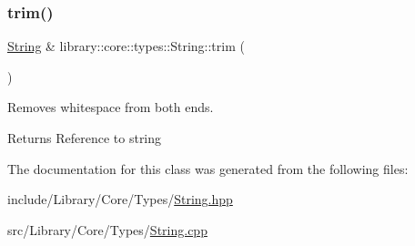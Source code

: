 \subsubsection{\texorpdfstring{trim()}{trim()}}
{\footnotesize\ttfamily \hyperlink{classlibrary_1_1core_1_1types_1_1_string}{String} \& library\+::core\+::types\+::\+String\+::trim (\begin{DoxyParamCaption}{ }\end{DoxyParamCaption})}



Removes whitespace from both ends. 

\begin{DoxyReturn}{Returns}
Reference to string 
\end{DoxyReturn}


The documentation for this class was generated from the following files\+:\begin{DoxyCompactItemize}
\item 
include/\+Library/\+Core/\+Types/\hyperlink{_string_8hpp}{String.\+hpp}\item 
src/\+Library/\+Core/\+Types/\hyperlink{_string_8cpp}{String.\+cpp}\end{DoxyCompactItemize}
